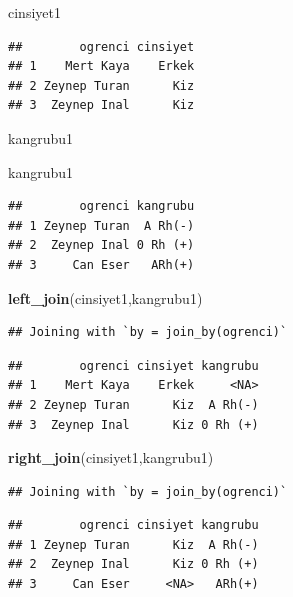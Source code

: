 \documentclass[
  oneside]{book}
\newenvironment{Shaded}{\begin{snugshade}}{\end{snugshade}}
\newcommand{\FunctionTok}[1]{\textcolor[rgb]{0.13,0.29,0.53}{\textbf{#1}}}
\newcommand{\NormalTok}[1]{#1}
\begin{document}
\begin{Shaded}
\begin{Highlighting}[]
\NormalTok{cinsiyet1}
\end{Highlighting}
\end{Shaded}

\begin{verbatim}
##        ogrenci cinsiyet
## 1    Mert Kaya    Erkek
## 2 Zeynep Turan      Kiz
## 3  Zeynep Inal      Kiz
\end{verbatim}

kangrubu1

\begin{Shaded}
\begin{Highlighting}[]
\NormalTok{kangrubu1}
\end{Highlighting}
\end{Shaded}

\begin{verbatim}
##        ogrenci kangrubu
## 1 Zeynep Turan  A Rh(-)
## 2  Zeynep Inal 0 Rh (+)
## 3     Can Eser   ARh(+)
\end{verbatim}

\begin{Shaded}
\begin{Highlighting}[]
\FunctionTok{left\_join}\NormalTok{(cinsiyet1,kangrubu1)}
\end{Highlighting}
\end{Shaded}

\begin{verbatim}
## Joining with `by = join_by(ogrenci)`
\end{verbatim}

\begin{verbatim}
##        ogrenci cinsiyet kangrubu
## 1    Mert Kaya    Erkek     <NA>
## 2 Zeynep Turan      Kiz  A Rh(-)
## 3  Zeynep Inal      Kiz 0 Rh (+)
\end{verbatim}

\begin{Shaded}
\begin{Highlighting}[]
\FunctionTok{right\_join}\NormalTok{(cinsiyet1,kangrubu1)}
\end{Highlighting}
\end{Shaded}

\begin{verbatim}
## Joining with `by = join_by(ogrenci)`
\end{verbatim}

\begin{verbatim}
##        ogrenci cinsiyet kangrubu
## 1 Zeynep Turan      Kiz  A Rh(-)
## 2  Zeynep Inal      Kiz 0 Rh (+)
## 3     Can Eser     <NA>   ARh(+)
\end{verbatim}
\end{document}
